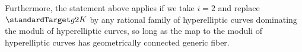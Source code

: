 \begin{theorem}
\begin{comment}
			\]
\[
	\frac{\left| \left\{ u \in \standardTarget g i {\mathbb Q}(\mathbb Q) : \on{Ht}(u) \le B, \, \left[ \grouphypboth g {(i \bmod 2)} {\mathbb Q} : \mono_{A_u}\right] = 2 \right\} \right|}{|\{u \in \standardTarget g i {\mathbb Q}(\mathbb Q) : \on{Ht}(u) \le B\}|} = 1 + O((\log B)^{-n}),
			\]
\end{comment}
\noindent Furthermore, the statement above applies
if we take $i = 2$ and replace
$\standardTarget g 2 K$ by any rational family 
of hyperelliptic curves
dominating the moduli of hyperelliptic curves,
so long as the map to the moduli of hyperelliptic
curves has geometrically connected generic fiber.
\begin{comment}
\textcolor[rgb]{1,0,0}{If $g = 1$, then for any $\varepsilon > 0$, and for $C \rightarrow U$ any family of genus $1$ curves dominating the moduli of genus $1$ curves or any of $\standardFamily 1 i K \rightarrow \standardTarget 1 i K$,
we have
			\[
				\frac{|\{u \in U : \lVert u \rVert \le B,\, [ \widetilde{\mathrm{G} \mathcal {S}}_{3, K}
				: \rho_{A_u}(G_K) ] = \delta_K \}|}{|\{u \in U(\OO_K): \lVert u \rVert \le B\}|} = 1 + O(B^{-1/2} \log B),
			\]
\[
	\frac{|\{u \in U : \on{Ht}(u) \leq B,\, [ \widetilde{\mathrm{G} \mathcal {S}}_{3, K} : \rho_{A_u}(G_K) ] = \delta_K \}|}{|\{u \in U(K) : \on{Ht}(u) \le B\}|} = 1 + O(B^{-1/2 + \varepsilon}). 
			\]}
\end{comment}
\end{theorem}


